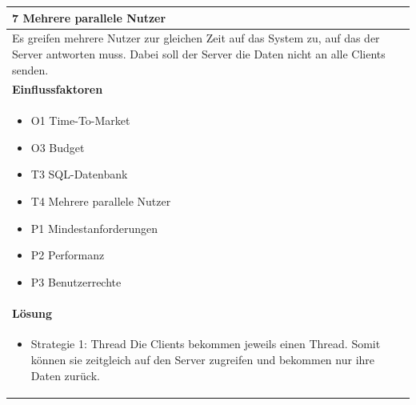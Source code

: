 \documentclass[fontsize=12pt,paper=a4,twoside]{scrartcl}
\begin{document}
\begin{table}[H]
\begin{tabular}{|p{\textwidth}|}\hline
7 Mehrere parallele Nutzer\\ \hline
Es greifen mehrere Nutzer zur gleichen Zeit auf das System zu, auf das der Server antworten muss. Dabei soll der Server die Daten nicht an alle Clients senden.\\ \hline
\textbf{Einflussfaktoren}\\
\begin{itemize}
\item O1 Time-To-Market
\item O3 Budget
\item T3 SQL-Datenbank
\item T4 Mehrere parallele Nutzer
\item P1 Mindestanforderungen
\item P2 Performanz
\item P3 Benutzerrechte
\end{itemize}\\ \hline
\textbf{Lösung}\\
\begin{itemize}
\item Strategie 1: Thread \leavevmode\newline
Die Clients bekommen jeweils einen Thread. Somit können sie zeitgleich auf den Server zugreifen und bekommen nur ihre Daten zurück.
\end{itemize} \\ \hline
\end{tabular}
\end{table}
\end{document}

